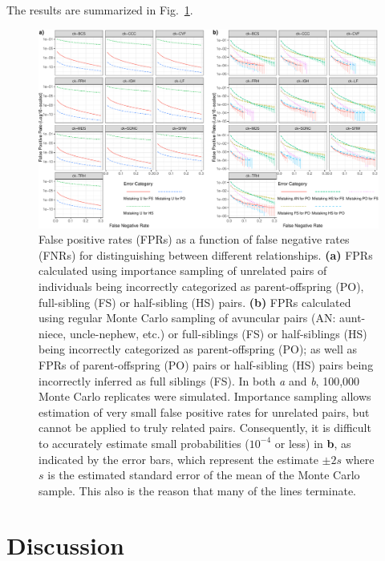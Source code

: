 The results are summarized in Fig.~\ref{fig:fprs}.
\begin{figure}
\newcommand{\fprcap}{\footnotesize False positive rates (FPRs) as a function of false negative
rates (FNRs) for distinguishing between different relationships.  {\bf (a)} FPRs calculated
using importance sampling of unrelated pairs of individuals being incorrectly categorized as parent-offspring (PO),
full-sibling (FS) or half-sibling (HS) pairs.  {\bf (b)}  FPRs calculated using regular Monte Carlo
sampling of avuncular pairs (AN: aunt-niece, uncle-nephew, etc.) or full-siblings (FS) or half-siblings (HS) being 
incorrectly categorized as parent-offspring (PO); as well as FPRs of parent-offspring (PO) pairs or half-sibling (HS) 
pairs being incorrectly inferred as full siblings (FS).  In both {\em a} and {\em b}, 100,000 Monte Carlo replicates 
were simulated.  Importance sampling allows estimation of very small false positive rates for unrelated pairs, but 
cannot be applied to truly related pairs.  Consequently, it is difficult to accurately estimate small probabilities 
($10^{-4}$ or less) in {\bf b}, as indicated by the error bars, which represent the estimate $\pm 2s$ where $s$ is the estimated standard error of the mean of the Monte Carlo sample.  This also is the reason that many of the lines terminate.   }
\begin{center}
\includegraphics[width=\textwidth]{images/fpr-fnr-figure-crop.pdf}
\end{center}
\caption[\fprcap]{\fprcap}
\label{fig:fprs}
\end{figure}





\section*{Discussion}

